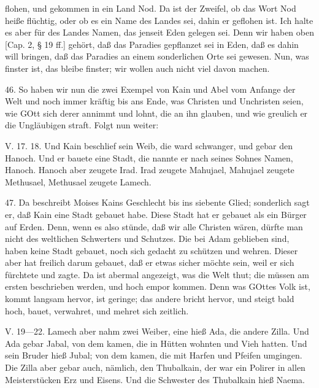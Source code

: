 flohen, und gekommen in ein Land Nod. Da ist der Zweifel, ob das Wort Nod heiße flüchtig, oder ob es ein Name des Landes sei, dahin er geflohen ist. Ich halte es aber für des Landes Namen, das jenseit Eden gelegen sei. Denn wir haben oben [Cap. 2, § 19 ff.] gehört, daß das Paradies gepflanzet sei in Eden, daß es dahin will bringen, daß das Paradies an einem sonderlichen Orte sei gewesen. Nun, was finster ist, das bleibe finster; wir wollen auch nicht viel davon machen.

46. So haben wir nun die zwei Exempel von Kain und Abel vom Anfange der Welt und noch immer kräftig bis ans Ende, was Christen und Unchristen seien, wie GOtt sich derer annimmt und lohnt, die an ihn glauben, und wie greulich er die Ungläubigen straft. Folgt nun weiter:

\begin{schriftzitat}
V. 17. 18. Und Kain beschlief sein Weib, die ward schwanger, und gebar den Hanoch. Und er bauete eine Stadt, die nannte er nach seines Sohnes Namen, Hanoch. Hanoch aber zeugete Irad. Irad zeugete Mahujael, Mahujael zeugete Methusael, Methusael zeugete Lamech.
\end{schriftzitat}

47. Da beschreibt Moises Kains Geschlecht bis ins siebente Glied; sonderlich sagt er, daß Kain eine Stadt gebauet habe. Diese Stadt hat er gebauet als ein Bürger auf Erden. Denn, wenn es also stünde, daß wir alle Christen wären, dürfte man nicht des weltlichen Schwerters und Schutzes. Die bei Adam geblieben sind, haben keine Stadt gebauet, noch sich gedacht zu schützen und wehren. Dieser aber hat freilich darum gebauet, daß er etwas sicher möchte sein, weil er sich fürchtete und zagte. Da ist abermal angezeigt, was die Welt thut; die müssen am ersten beschrieben werden, und hoch empor kommen. Denn was GOttes Volk ist, kommt langsam hervor, ist geringe; das andere bricht hervor, und steigt bald hoch, bauet, verwahret, und mehret sich zeitlich.

\begin{schriftzitat}
V. 19—22. Lamech aber nahm zwei Weiber, eine hieß Ada, die andere Zilla. Und Ada gebar Jabal, von dem kamen, die in Hütten wohnten und Vieh hatten. Und sein Bruder hieß Jubal; von dem kamen, die mit Harfen und Pfeifen umgingen. Die Zilla aber gebar auch, nämlich, den Thubalkain, der war ein Polirer in allen Meisterstücken Erz und Eisens. Und die Schwester des Thubalkain hieß Naema.
\end{schriftzitat}

